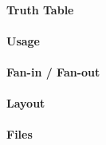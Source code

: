 \paragraph{Truth Table}
%

\paragraph{Usage}

\paragraph{Fan-in / Fan-out}

\paragraph{Layout}

\paragraph{Files}
